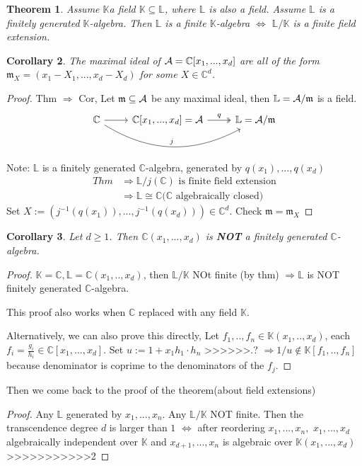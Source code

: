 \documentclass[11pt]{article}
\newtheorem{thm}{Theorem}[section]
\newtheorem{cor}[thm]{Corollary}
\newcommand{\cplx}{\mathbb C}
\newcommand{\bbk}{\mathbb K}
\newcommand{\scm}{{\mathfrak m}}
\newcommand{\cala}{{\cal A}}
\newcommand{\Lrta}{\Longrightarrow}
\newcommand{\Llrta}{\Longleftrightarrow}
\begin{document}
\begin{thm}
Assume $\bbk$a field $\bbk\subseteq \mathbb{L}$, where $\mathbb{L}$ is also a field. Assume $\mathbb{L}$ is a finitely generated $\bbk$-algebra. Then $\mathbb{L}$ is a finite $\bbk$-algebra $\Llrta$ $\mathbb{L}/\bbk$ is a finite field extension.
\end{thm}

\begin{cor}
The maximal ideal of $\cala=\cplx[x_1,...,x_d]$ are all of the form $\scm_X=(x_1-X_1,...,x_d-X_d)$ for some $X\in\cplx^d$.
\end{cor}
\begin{proof}
Thm $\Lrta$ Cor, Let $\scm\subseteq \cala$ be any maximal ideal, then $\mathbb{L}=\cala/\scm$ is a field.
 \[
\begin{tikzcd}
\cplx\ar[r]\ar[rr,bend right,"j"]&\cplx[x_1,...,x_d]=\cala\ar[r,two heads,"q"]&\mathbb{L}=\cala/\scm  
\end{tikzcd}
\] 
Note: $\mathbb{L}$ is a finitely generated $\cplx$-algebra, generated by $q(x_1),...,q(x_d)$
$$
\begin{aligned}
Thm&\Lrta \mathbb{L}/j(\cplx)\text{ is finite field extension}\\
 & \Lrta
\mathbb{L}\cong \cplx \text{($\cplx$ algebraically closed)}
\end{aligned}
$$
Set $X:=(j^{-1}(q(x_1)),...,j^{-1}(q(x_d)))\in \cplx^d$. Check $\scm=\scm_X$
\end{proof}

\begin{cor}
Let $d\geq 1$. Then $\cplx(x_1,...,x_d)$ is \textbf{NOT} a finitely generated $\cplx$-algebra.
\end{cor}
\begin{proof}
$\bbk=\cplx, \mathbb{L}=\cplx(x_1,..,x_d)$, then $\mathbb{L}/\bbk$ NOt finite (by thm) $\Lrta \mathbb{L}$ is NOT finitely generated $\cplx$-algebra.

This proof also works when $\cplx$ replaced with any field $\bbk$.

Alternatively, we can also prove this directly, Let $f_1,..,f_n\in\bbk(x_1,..,x_d)$, each $f_i=\frac{g_i}{h_i}\in \cplx[x_1,...,x_d]$. Set $u:=1+x_1 h_1\cdot h_n$
>>>>>>.?
$\Lrta 1/u\notin \bbk[f_1,..,f_n]$ because denominator is coprime to the denominators of the $f_j$.
\end{proof}

Then we come back to the proof of the theorem(about field extensions)

\begin{proof}
Any $\mathbb{L}$ generated by $x_1,...,x_n$. Any $\mathbb{L}/\bbk$ NOT finite. Then the  transcendence degree $d$ is larger than $1$
$\Llrta$ after reordering $x_1,...,x_n,$ $x_1,...,x_d$ algebraically independent over $\bbk$ and $x_{d+1},...,x_n$ is algebraic over $\bbk(x_1,...,x_d)$
>>>>>>>>>>>2
\end{proof}
\end{document}
